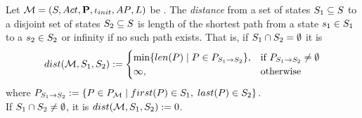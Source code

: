 \documentclass[preview]{standalone}
\begin{document}
\begin{definition}
	Let ${{{\mathcal{M}}}} = {{({S}, {Act}, {\textbf{P}}, {\iota_{init}}, {AP}, {L})}}$ be \achgphN. The \emph{distance} from a set of states ${S}_1 \subseteq {S}$ to a disjoint set of states ${S}_2 \subseteq {S}$ is length of the shortest path from a state ${s}_1 \in {S}_1$ to a ${s}_2 \in {S}_2$ or infinity if no such path exists. That is, if ${S}_1 \cap {S}_2 = \emptyset$ it is		
	\[
		{dist}({{{\mathcal{M}}}}, {S}_1, {S}_2) := 
		\begin{cases}
			\min\{{len}({P}) \mid {P} \in P_{{S}_1 \to {S}_2}\}, &\text{if } P_{{S}_1 \to {S}_2} \neq \emptyset \\
			\infty, &\text{otherwise}
		\end{cases}
	\]
	where $P_{\states_1 \to \states_2} := \{\path \in \pathset \mid \pfirst(\path) \in \states_1, \; \plast(\path) \in \states_2\}$. \\
	\noindent
	If ${S}_1 \cap {S}_2 \neq \emptyset$, it is ${dist}({{{\mathcal{M}}}}, {S}_1, {S}_2) := 0$.
	\label{def:distance}
\end{definition}

\end{document}
